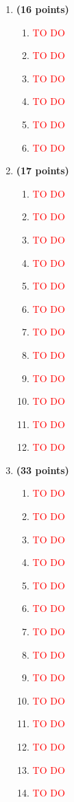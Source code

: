 \documentclass[a4paper]{article}
\newcommand{\TODO}{\textcolor{red}{TO DO}}
\begin{document}
\begin{enumerate}
\item \textbf{(16 points)} 
    \begin{enumerate}
    \item \TODO
    \item \TODO
    \item \TODO
    \item \TODO
    \item \TODO
    \item \TODO
    \end{enumerate}

\item \textbf{(17 points)} 
    \begin{enumerate}
    \item \TODO
    \item \TODO
    \item \TODO
    \item \TODO
    \item \TODO
    \item \TODO
    \item \TODO
    \item \TODO
    \item \TODO
    \item \TODO
    \item \TODO
    \item \TODO
    \end{enumerate}

\item \textbf{(33 points)} 
    \begin{enumerate}
    \item \TODO
    \item \TODO
    \item \TODO
    \item \TODO
    \item \TODO
    \item \TODO
    \item \TODO
    \item \TODO
    \item \TODO
    \item \TODO
    \item \TODO
    \item \TODO
    \item \TODO
    \item \TODO
    \end{enumerate} 


\end{enumerate}
\end{document}
